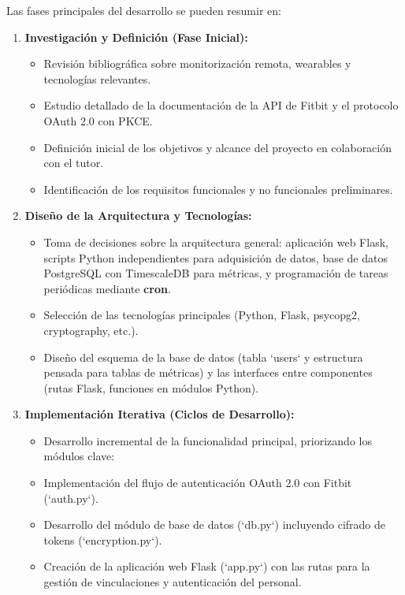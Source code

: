Las fases principales del desarrollo se pueden resumir en:

\begin{enumerate}
    \item \textbf{Investigación y Definición (Fase Inicial):}
        \begin{itemize}
            \item Revisión bibliográfica sobre monitorización remota, wearables y tecnologías relevantes.
            \item Estudio detallado de la documentación de la API de Fitbit\textsuperscript{\textregistered} y el protocolo OAuth 2.0 con PKCE.
            \item Definición inicial de los objetivos y alcance del proyecto en colaboración con el tutor.
            \item Identificación de los requisitos funcionales y no funcionales preliminares.
        \end{itemize}
    \item \textbf{Diseño de la Arquitectura y Tecnologías:}
        \begin{itemize}
            \item Toma de decisiones sobre la arquitectura general: aplicación web Flask, scripts Python independientes para adquisición de datos, base de datos PostgreSQL con TimescaleDB para métricas, y programación de tareas periódicas mediante \textbf{cron}.
            \item Selección de las tecnologías principales (Python, Flask, psycopg2, cryptography, etc.).
            \item Diseño del esquema de la base de datos (tabla `users` y estructura pensada para tablas de métricas) y las interfaces entre componentes (rutas Flask, funciones en módulos Python).
        \end{itemize}
    \item \textbf{Implementación Iterativa (Ciclos de Desarrollo):}
        \begin{itemize}
            \item Desarrollo incremental de la funcionalidad principal, priorizando los módulos clave:
            \item Implementación del flujo de autenticación OAuth 2.0 con Fitbit\textsuperscript{\textregistered} (`auth.py`).
            \item Desarrollo del módulo de base de datos (`db.py`) incluyendo cifrado de tokens (`encryption.py`).
            \item Creación de la aplicación web Flask (`app.py`) con las rutas para la gestión de vinculaciones y autenticación del personal.

\end{itemize}
\end{enumerate}
